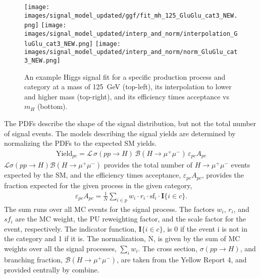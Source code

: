 \begin{figure}[h!]
    \centering
    \texttt{[image: images/signal\_model\_updated/ggf/fit\_mh\_125\_GluGlu\_cat3\_NEW.png]}
    \texttt{[image: images/signal\_model\_updated/interp\_and\_norm/interpolation\_GluGlu\_cat3\_NEW.png]}
    \texttt{[image: images/signal\_model\_updated/interp\_and\_norm/norm\_GluGlu\_cat3\_NEW.png]}
    \caption[An example of the signal model.]
    {An example Higgs signal fit for a specific production
    process and category at a mass of 125~GeV (top-left), its
    interpolation to lower and higher mass (top-right), and its efficiency times
    acceptance vs $m_H$ (bottom).}
    \label{sigmodel:gaus}
\end{figure}
The PDFs describe the shape of the signal distribution, but not the total number of signal events. The models describing the signal yields are determined by normalizing the PDFs to the expected SM yields. 
\begin{align}
        \label{eq:expectedYield}
        \text{Yield}_{pc} = \mathcal{L}\,\sigma(pp\rightarrow H)\, \mathcal{B}(H\rightarrow\mu^+\mu^-) \, \varepsilon_{pc}A_{pc}
\end{align}
$\mathcal{L}\sigma(pp\rightarrow H)\mathcal{B}(H\rightarrow\mu^+\mu^-)$ provides the total number of $H\rightarrow\mu^+\mu^-$ events expected by the SM, and the efficiency times acceptance, $\varepsilon_{pc} A_{pc}$, provides the fraction expected for the given process in the given category, 
\begin{align}
\varepsilon_{pc} A_{pc} = \frac{1}{N}\sum_{i \in p} w_{i} \cdot r_{i} \cdot \text{sf}_i \cdot \mathbf{I}\{i \in c\}.
\end{align}
The sum runs over all MC events for the signal process. The factors $w_i$, $r_i$, and $sf_i$ are the MC weight, the PU reweighting factor, and the scale factor for the event, respectively. The indicator function, $\mathbf{I}\{i \in c\}$, is 0 if the event i is not in the category and 1 if it is. The normalization, N, is given by the sum of MC weights over all the signal processes, $\sum_{i}w_{i}$. The cross section, $\sigma(pp\rightarrow H)$, and branching fraction, $\mathcal{B}(H\rightarrow\mu^+\mu^-)$, are taken from the Yellow Report 4, and provided centrally by combine.

